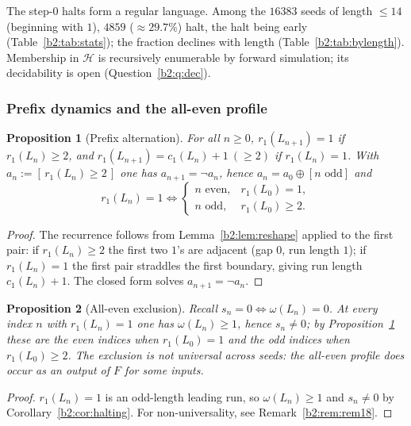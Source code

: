 \documentclass[a4paper]{article}
\theoremstyle{plain}
\newtheorem{proposition}{Proposition}[subsection]
\theoremstyle{definition}
\theoremstyle{remark}
\begin{document}
The step-$0$ halts form a regular language. Among the $16383$ seeds of length $\le 14$ (beginning with $1$), $4859$ ($\approx 29.7\%$) halt, the halt being early (Table~\ref{b2:tab:stats}); the fraction declines with length (Table~\ref{b2:tab:bylength}). Membership in $\mathcal H$ is recursively enumerable by forward simulation; its decidability is open (Question~\ref{b2:q:dec}).

\subsubsection{Prefix dynamics and the all-even profile}\label{b2:sec:prefix}
\begin{proposition}[Prefix alternation]\label{b2:prop:prefix}
For all $n\ge 0$, $r_1(L_{n+1})=1$ if $r_1(L_n)\ge 2$, and $r_1(L_{n+1})=c_1(L_n)+1\ (\ge 2)$ if $r_1(L_n)=1$. With $a_n:=[\,r_1(L_n)\ge 2\,]$ one has $a_{n+1}=\lnot a_n$, hence $a_n=a_0\oplus[n\text{ odd}]$ and
\[ r_1(L_n)=1\iff \begin{cases} n\text{ even}, & r_1(L_0)=1,\\ n\text{ odd}, & r_1(L_0)\ge 2. \end{cases} \]
\end{proposition}
\begin{proof}
The recurrence follows from Lemma~\ref{b2:lem:reshape} applied to the first pair: if $r_1(L_n)\ge 2$ the first two $1$'s are adjacent (gap $0$, run length $1$); if $r_1(L_n)=1$ the first pair straddles the first boundary, giving run length $c_1(L_n)+1$. The closed form solves $a_{n+1}=\lnot a_n$.
\end{proof}

\begin{proposition}[All-even exclusion]\label{b2:prop:alleven}
Recall $s_n=0\iff\omega(L_n)=0$. At every index $n$ with $r_1(L_n)=1$ one has $\omega(L_n)\ge 1$, hence $s_n\ne 0$; by Proposition~\ref{b2:prop:prefix} these are the even indices when $r_1(L_0)=1$ and the odd indices when $r_1(L_0)\ge 2$. The exclusion is \emph{not universal} across seeds: the all-even profile does occur as an output of $F$ for some inputs.
\end{proposition}
\begin{proof}
$r_1(L_n)=1$ is an odd-length leading run, so $\omega(L_n)\ge 1$ and $s_n\ne 0$ by Corollary~\ref{b2:cor:halting}. For non-universality, see Remark~\ref{b2:rem:rem18}.
\end{proof}
\end{document}
